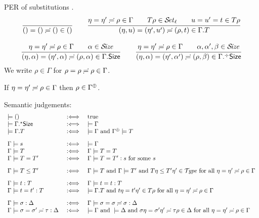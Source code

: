 \documentclass[acmlarge,review,anonymous]{acmart}\settopmatter{printfolios=true}
\begin{document}
PER of substitutions
.
\begin{gather*}
  \ru{
    }{\sempty = \sempty \eeq \sempty \in \cempty}
\qquad
  \ru{\eta = \eta' \eeq \rho \in \Gamma \qquad
      T\rho \in \SET[\ell] \qquad
      u = u' = t \in T \rho
    }{\sext \eta u = \sext{\eta'}{u'} \eeq \sext{\rho}{t} \in \cext \Gamma T}
\\[2ex]
  \ru{\eta = \eta' \eeq \rho \in \Gamma \qquad \alpha \in \SIZE
    }{\sext \eta \alpha = \sext{\eta'}{\alpha} \eeq \sext{\rho}{\alpha} \in \cext \Gamma \Size}
\qquad
  \ru{\eta = \eta' \eeq \rho \in \Gamma \qquad \alpha,\alpha',\beta \in \SIZE
    }{\sext \eta \alpha = \sext{\eta'}{\alpha'} \eeq \sext{\rho}{\beta} \in \erext \Gamma \Size}
\end{gather*}
We write $\rho \in \Gamma$ for $\rho = \rho \risingdotseq \rho \in \Gamma$.
\begin{lemma}[Resurrection]
  \label{lem:resenv}
  If $\eta = \eta' \risingdotseq \rho \in \Gamma$ then $\rho \in \resurrect\Gamma$.
\end{lemma}

Semantic judgements:
\[
\begin{array}{l@{\quad}l@{\quad}l}
  \models () & \defas & \mtrue \\
  \models \eext \Gamma \Size & \defas & \models \Gamma \\
  \models \cext \Gamma T     & \defas & \models \Gamma \mand \resurrect\Gamma \models T
\\[2ex]
  \Gamma \models s & \defas & \models \Gamma \\
  \Gamma \models T & \defas & \Gamma \models T = T \\
  \Gamma \models T = T' & \defas & \Gamma \models T = T' : s \mforsome s %
\\[2ex]
  \Gamma \models T \leq T' & \defas & \Gamma \models T \mand \Gamma \models T' \mand
    T\eta \leq T'\eta' \in \TYPE
    \mforall \eta = \eta' \eeq \rho \in \Gamma
\\[2ex]
  \Gamma \models t : T & \defas & \Gamma \models t = t : T \\
  \Gamma \models t = t' : T & \defas & %
    \models \cext \Gamma T \mand
    t \eta = t' \eta' \in T \rho \mforall \eta = \eta' \eeq \rho \in \Gamma
\\[2ex]
  \Gamma \models \sigma : \Delta & \defas & \Gamma \models \sigma = \sigma \eeq \sigma : \Delta \\
  \Gamma \models \sigma = \sigma' \eeq \tau : \Delta & \defas &
    \models \Gamma \mand \models \Delta \mand
    \sigma \eta = \sigma' \eta' \eeq \tau \rho \in \Delta
    \mforall \eta = \eta' \eeq \rho \in \Gamma
\end{array}
\]
\end{document}
